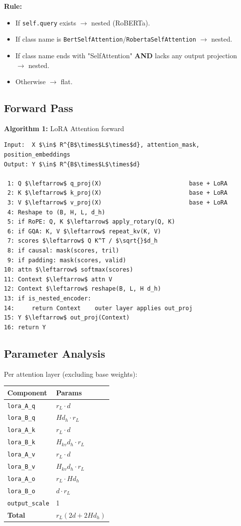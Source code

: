 \textbf{Rule:}
\begin{itemize}
\item If \texttt{self.query} exists $\to$ nested (RoBERTa).
\item If class name is \texttt{BertSelfAttention}/\texttt{RobertaSelfAttention} $\to$ nested.
\item If class name ends with "SelfAttention" \textbf{AND} lacks any output projection $\to$ nested.
\item Otherwise $\to$ flat.

\end{itemize}
\subsection{Forward Pass}

\textbf{Algorithm 1:} LoRA Attention forward
\begin{lstlisting}
Input:  X $\in$ R^{B$\times$L$\times$d}, attention_mask, position_embeddings
Output: Y $\in$ R^{B$\times$L$\times$d}

 1: Q $\leftarrow$ q_proj(X)                         base + LoRA
 2: K $\leftarrow$ k_proj(X)                         base + LoRA
 3: V $\leftarrow$ v_proj(X)                         base + LoRA
 4: Reshape to (B, H, L, d_h)
 5: if RoPE: Q, K $\leftarrow$ apply_rotary(Q, K)
 6: if GQA: K, V $\leftarrow$ repeat_kv(K, V)
 7: scores $\leftarrow$ Q K^T / $\sqrt{}$d_h
 8: if causal: mask(scores, tril)
 9: if padding: mask(scores, valid)
10: attn $\leftarrow$ softmax(scores)
11: Context $\leftarrow$ attn V
12: Context $\leftarrow$ reshape(B, L, H d_h)
13: if is_nested_encoder:
14:     return Context    outer layer applies out_proj
15: Y $\leftarrow$ out_proj(Context)
16: return Y
\end{lstlisting}

\subsection{Parameter Analysis}

Per attention layer (excluding base weights):

\begin{table}[H]
\centering
\small
\begin{tabular}{ll}
\toprule
\textbf{Component} & \textbf{Params} \\
\midrule
\texttt{lora\_A\_q} & $r_L \cdot d$ \\
\texttt{lora\_B\_q} & $H d_h \cdot r_L$ \\
\texttt{lora\_A\_k} & $r_L \cdot d$ \\
\texttt{lora\_B\_k} & $H_{kv} d_h \cdot r_L$ \\
\texttt{lora\_A\_v} & $r_L \cdot d$ \\
\texttt{lora\_B\_v} & $H_{kv} d_h \cdot r_L$ \\
\texttt{lora\_A\_o} & $r_L \cdot H d_h$ \\
\texttt{lora\_B\_o} & $d \cdot r_L$ \\
\texttt{output\_scale} & 1 \\
\textbf{Total} & $r_L (2d + 2 H d_h)$ \\
\bottomrule
\end{tabular}
\end{table}

